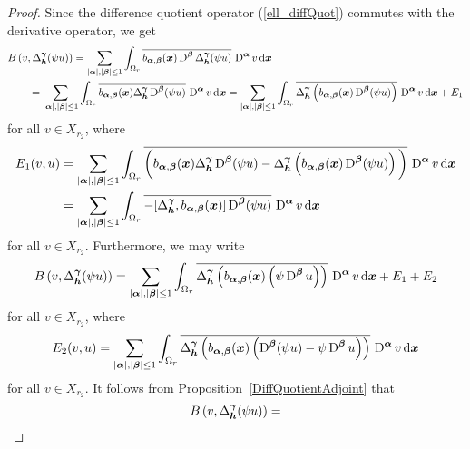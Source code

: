 \begin{proof}
Since the difference quotient operator (\ref{ell_diffQuot}) commutes
with the derivative operator, we get
\begin{align*}
&B\left(v,\Delta_{{\bm{h}}}^{{\bm{\gamma}}}(\psi u)\right) =
\sum_{|{\bm{\alpha}}|,|{\bm{\beta}}|\leq 1}
\int_{\Omega_r} \overline{b_{{\bm{\alpha}},{\bm{\beta}}}({\bm{x}})
\operatorname{D}^{{\bm{\beta}}} \Delta_{{\bm{h}}}^{{\bm{\gamma}}}(\psi u)}\,
\operatorname{D}^{{\bm{\alpha}}} v \,\mathrm{d}{{\bm{x}}} \\
&\qquad = \sum_{|{\bm{\alpha}}|,|{\bm{\beta}}|\leq 1}
\int_{\Omega_r} \overline{b_{{\bm{\alpha}},{\bm{\beta}}}({\bm{x}})
\Delta_{{\bm{h}}}^{{\bm{\gamma}}} \operatorname{D}^{{\bm{\beta}}} (\psi u)}\,
\operatorname{D}^{{\bm{\alpha}}} v \,\mathrm{d}{{\bm{x}}}
= \sum_{|{\bm{\alpha}}|,|{\bm{\beta}}|\leq 1}
\int_{\Omega_r} \overline{
\Delta_{{\bm{h}}}^{{\bm{\gamma}}} \left(b_{{\bm{\alpha}},{\bm{\beta}}}({\bm{x}})
\operatorname{D}^{{\bm{\beta}}} (\psi u)\right)} \, \operatorname{D}^{{\bm{\alpha}}} v \,\mathrm{d}{{\bm{x}}} + E_1
\end{align*}
for all $v \in X_{r_2}$, where
\begin{align*}
E_1(v,u) &= \sum_{|{\bm{\alpha}}|,|{\bm{\beta}}|\leq 1}
\int_{\Omega_r} \overline{\bigg( b_{{\bm{\alpha}},{\bm{\beta}}}({\bm{x}})
\Delta_{{\bm{h}}}^{{\bm{\gamma}}} \operatorname{D}^{{\bm{\beta}}} (\psi u) - 
\Delta_{{\bm{h}}}^{{\bm{\gamma}}} \left(b_{{\bm{\alpha}},{\bm{\beta}}}({\bm{x}})
\operatorname{D}^{{\bm{\beta}}} (\psi u)\right)\bigg)} \,
\operatorname{D}^{{\bm{\alpha}}} v \,\mathrm{d}{{\bm{x}}} \\
&= \sum_{|{\bm{\alpha}}|,|{\bm{\beta}}|\leq 1}
\int_{\Omega_r} \overline{-[\Delta_{{\bm{h}}}^{{\bm{\gamma}}},
b_{{\bm{\alpha}},{\bm{\beta}}}({\bm{x}})]
\operatorname{D}^{{\bm{\beta}}} (\psi u) }\, \operatorname{D}^{{\bm{\alpha}}} v \,\mathrm{d}{{\bm{x}}}
\end{align*}
for all $v \in X_{r_2}$.
Furthermore, we may write
\begin{equation} \label{ell_RB_foot}
B\left(v,\Delta_{{\bm{h}}}^{{\bm{\gamma}}}(\psi u)\right)
= \sum_{|{\bm{\alpha}}|,|{\bm{\beta}}|\leq 1}
\int_{\Omega_r} \overline{
\Delta_{{\bm{h}}}^{{\bm{\gamma}}} \left(b_{{\bm{\alpha}},{\bm{\beta}}}({\bm{x}})
\left( \psi \operatorname{D}^{{\bm{\beta}}} u\right) \right)} \,
\operatorname{D}^{{\bm{\alpha}}} v \,\mathrm{d}{{\bm{x}}} + E_1 + E_2
\end{equation}
for all $v \in X_{r_2}$,
where
\[
E_2(v,u) = \sum_{|{\bm{\alpha}}|,|{\bm{\beta}}|\leq 1}
\int_{\Omega_r} \overline{
\Delta_{{\bm{h}}}^{{\bm{\gamma}}} \left(b_{{\bm{\alpha}},{\bm{\beta}}}({\bm{x}})
\left(\operatorname{D}^{{\bm{\beta}}}( \psi u) - \psi \operatorname{D}^{{\bm{\beta}}} u\right) \right)}
\, \operatorname{D}^{{\bm{\alpha}}} v \,\mathrm{d}{{\bm{x}}}
\]
for all $v \in X_{r_2}$.  It follows from Proposition~\ref{DiffQuotientAdjoint}
that
\[
B\left(v,\Delta_{{\bm{h}}}^{{\bm{\gamma}}}(\psi u)\right) =
\]
\end{proof}

